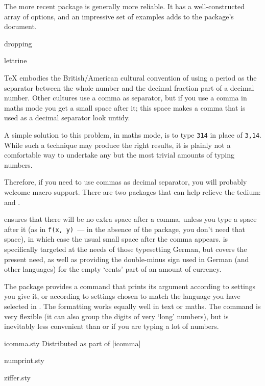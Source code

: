 The more recent  package is generally more reliable.
It has a well-constructed array of options, and an impressive set of
examples adds to the package's document.
\begin{ctanrefs}
\item[dropping]
\item[lettrine]
\end{ctanrefs}


\TeX{} embodies the British/American cultural convention of using a
period as the separator between the whole number and the decimal
fraction part of a decimal number.  Other cultures use a comma as
separator, but if you use a comma in maths mode you get a small space
after it; this space makes a comma that is used as a decimal separator
look untidy.

A simple solution to this problem, in maths mode, is to type
\texttt{3}\marg{,}\texttt{14} in place of \texttt{3,14}.  While such a
technique may produce the right results, it is plainly not a
comfortable way to undertake any but the most trivial amounts of
typing numbers.

Therefore, if you need to use commas as decimal separator, you will
probably welcome macro support.  There are two packages that
can help relieve the tedium:  and .

 ensures that there will be no extra space after a
comma, unless you type a space after it (as in \texttt{f(x, y)}~--- in
the absence of the package, you don't need that space), in which case
the usual small space after the comma appears.   is
specifically targeted at the needs of those typesetting German, but
covers the present need, as well as providing the double-minus sign
used in German (and other languages) for the empty `cents' part of an
amount of currency.

The  package provides a command
 that prints its argument according to
settings you give it, or according to settings chosen to match the
language you have selected in .  The formatting works
equally well in text or maths.  The command is very flexible (it can also
group the digits of very `long' numbers), but is inevitably less
convenient than  or  if you are typing a
lot of numbers.
\begin{ctanrefs}
\item[icomma.sty]Distributed as part of [icomma]
\item[numprint.sty]
\item[ziffer.sty]
\end{ctanrefs}

